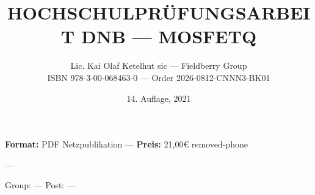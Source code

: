 \documentclass[a4paper,12pt]{article}
\title{HOCHSCHULPRÜFUNGSARBEIT DNB — MOSFETQ}
\author{Lic. Kai Olaf Ketelhut sic — Fieldberry Group\\ISBN 978-3-00-068463-0 — Order 2026-0812-CNNN3-BK01}
\date{14. Auflage, 2021}
\begin{document}
\maketitle

\textbf{Format:} PDF Netzpublikation — \textbf{Preis:} 21,00€ removed-phone

\QUBITS — \PageZero

\matrixcover

\vspace{5mm}
Group: \SantBerkGroup — Post: \SantBerkPost — \evergreen
\end{document}

